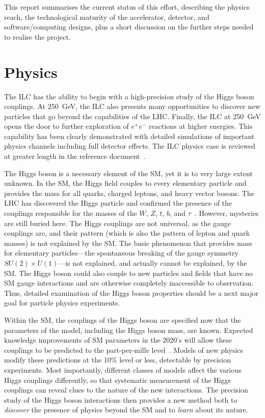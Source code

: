 \documentclass[%
 reprint,
 floatfix,
 amsmath,amssymb,
 aps,
]{revtex4-1}
\def\ee{e^+e^-}
\begin{document}
This report summarises the current status of this effort, describing
the physics reach, the technological maturity of the accelerator,
detector, and software/computing designs,
plus a short discussion on the further steps 
 needed to realise the project.

\vspace{-.4cm}

\section{\label{sec:phys}Physics}

\vspace{-.3cm}

The ILC has the ability to begin with a high-precision study of the Higgs boson couplings.  At 250~GeV, the ILC also
presents many opportunities to discover new particles that go beyond
the capabilities of the LHC.  Finally, the ILC at 250~GeV opens the
door to further exploration of $\ee$ reactions at higher energies. This capability has been clearly demonstrated with detailed simulations of important physics channels including full detector effects. The ILC physics case is reviewed at greater length in the reference document~\cite{ILCforESS}.

The Higgs boson is a necessary element of the SM, yet it is to very large extent unknown.    In the SM, the Higgs field
couples to every elementary particle and provides the mass for all
quarks, charged leptons, and heavy vector bosons.   The LHC has discovered
the Higgs particle and confirmed the presence of the couplings responsible for the
masses of the $W$, $Z$, $t$, $b$, and $\tau$~\cite{LHCHiggssummary}. 
 However, mysteries are still
buried here.   The Higgs couplings are not universal, as the gauge
couplings are, and their pattern (which is also the pattern of lepton
and quark masses) is not explained by the SM.  The basic phenomenon that provides
mass for elementary particles---the spontaneous breaking of the gauge
symmetry $SU(2)\times U(1)$---is not explained, and actually cannot be
explained, by the SM.   The Higgs boson could also couple to new
particles and fields that have no SM gauge interactions and are
otherwise completely inaccessible to observation.  Thus, detailed
examination of the Higgs boson properties should be a next major
goal for particle physics experiments.

Within the SM, the couplings of the Higgs boson are specified now that
the parameters of the model, including the Higgs boson mass, are
known.  Expected knowledge improvements of SM parameters in the 2020's will allow these couplings to be predicted to the part-per-mille level~\cite{Lepage:2014fla}.
Models of new physics modify these predictions at the 10\% level or less, 
detectable by precision experiments.   Most importantly, different
classes of models affect the various Higgs couplings differently, so that
systematic measurement of the Higgs couplings can reveal clues to the
nature of the new interactions.   The precision study of the
Higgs boson interactions then provides a new method both to {\it discover}  the
presence of physics beyond the SM and to {\it learn}  about its nature.
\end{document}
